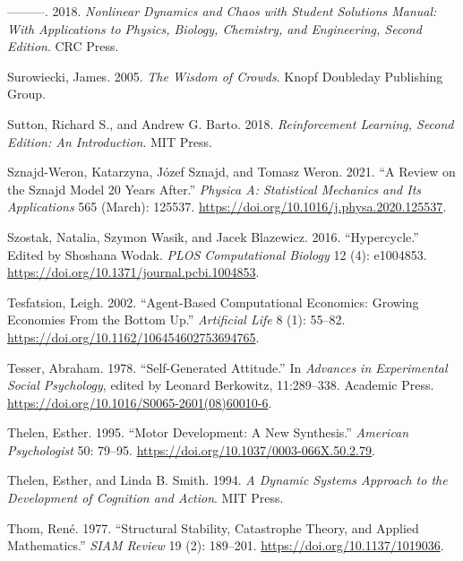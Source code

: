 \documentclass[
  a4paper,
  DIV=11,
  numbers=noendperiod,
  oneside]{scrreprt}
\newlength{\cslhangindent}
\newenvironment{CSLReferences}[2] %
 {\begin{list}{}{%
  \setlength{\itemindent}{0pt}
  \setlength{\leftmargin}{0pt}
  \setlength{\parsep}{0pt}
  \ifodd #1
   \setlength{\leftmargin}{\cslhangindent}
   \setlength{\itemindent}{-1\cslhangindent}
  \fi
  \setlength{\itemsep}{#2\baselineskip}}}
 {\end{list}}
\begin{document}
\begin{CSLReferences}{1}{0}
---------. 2018. \emph{Nonlinear {Dynamics} and {Chaos} with {Student
Solutions Manual}: {With Applications} to {Physics}, {Biology},
{Chemistry}, and {Engineering}, {Second Edition}}. {CRC Press}.

Surowiecki, James. 2005. \emph{The {Wisdom} of {Crowds}}. {Knopf
Doubleday Publishing Group}.

Sutton, Richard S., and Andrew G. Barto. 2018. \emph{Reinforcement
{Learning}, Second Edition: {An Introduction}}. {MIT Press}.

Sznajd-Weron, Katarzyna, Józef Sznajd, and Tomasz Weron. 2021. {``A
Review on the {Sznajd} Model \textemdash{} 20 Years After.''}
\emph{Physica A: Statistical Mechanics and Its Applications} 565
(March): 125537. \url{https://doi.org/10.1016/j.physa.2020.125537}.

Szostak, Natalia, Szymon Wasik, and Jacek Blazewicz. 2016.
{``Hypercycle.''} Edited by Shoshana Wodak. \emph{PLOS Computational
Biology} 12 (4): e1004853.
\url{https://doi.org/10.1371/journal.pcbi.1004853}.

Tesfatsion, Leigh. 2002. {``Agent-{Based Computational Economics}:
{Growing Economies From} the {Bottom Up}.''} \emph{Artificial Life} 8
(1): 55--82. \url{https://doi.org/10.1162/106454602753694765}.

Tesser, Abraham. 1978. {``Self-{Generated Attitude}.''} In
\emph{Advances in {Experimental Social Psychology}}, edited by Leonard
Berkowitz, 11:289--338. {Academic Press}.
\url{https://doi.org/10.1016/S0065-2601(08)60010-6}.

Thelen, Esther. 1995. {``Motor Development: {A} New Synthesis.''}
\emph{American Psychologist} 50: 79--95.
\url{https://doi.org/10.1037/0003-066X.50.2.79}.

Thelen, Esther, and Linda B. Smith. 1994. \emph{A {Dynamic Systems
Approach} to the {Development} of {Cognition} and {Action}}. {MIT
Press}.

Thom, René. 1977. {``Structural {Stability}, {Catastrophe Theory}, and
{Applied Mathematics}.''} \emph{SIAM Review} 19 (2): 189--201.
\url{https://doi.org/10.1137/1019036}.


\end{CSLReferences}
\end{document}

